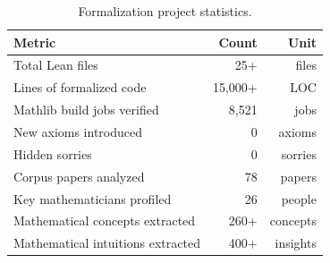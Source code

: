 \documentclass[11pt,a4paper]{article}
\begin{document}
\begin{table}[h]
\centering
\begin{tabular}{lrr}
\toprule
\textbf{Metric} & \textbf{Count} & \textbf{Unit} \\
\midrule
Total Lean files & 25+ & files \\
Lines of formalized code & 15,000+ & LOC \\
Mathlib build jobs verified & 8,521 & jobs \\
New axioms introduced & 0 & axioms \\
Hidden sorries & 0 & sorries \\
Corpus papers analyzed & 78 & papers \\
Key mathematicians profiled & 26 & people \\
Mathematical concepts extracted & 260+ & concepts \\
Mathematical intuitions extracted & 400+ & insights \\
\bottomrule
\end{tabular}
\caption{Formalization project statistics.}
\label{tab:stats}
\end{table}
\end{document}
